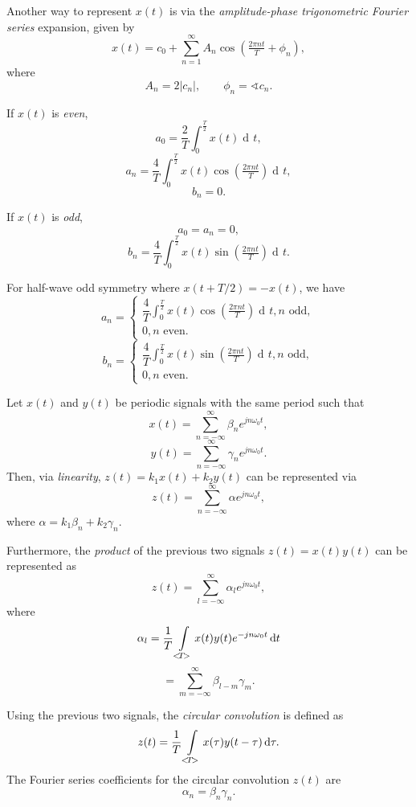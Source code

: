 \documentclass[10pt,letterpaper]{article}
\DeclareMathOperator{\di}{d\!} %
\newcommand{\sumi}[1][1]{ \sum_{n={#1}}^{\infty} } %
\newcommand{\bracks}[1]{ \left( #1 \right) } %
\newcommand{\tpfrac}[2]{\left(\tfrac{#1}{#2}\right)} %
\newcommand{\abs}[1]{\left| #1 \right|} %
\newcommand{\xabs}{ \abs{x(t)}^2 }
\newcommand{\Uint}{ \int\displaylimits_{<\!T\!>} }
\newcommand{\fatcos}{ \cos\tpfrac{2\pi nt}{T} }
\newcommand{\fatsin}{ \sin\tpfrac{2\pi nt}{T} }
\newcommand{\Hint}{ \int_0^{\frac{T}{2}} }
\newcommand{\omegaE}{ e^{jn\omega_0t} }
\newcommand{\omegaEneg}{ e^{-jn\omega_0t} }
\begin{document}
\begin{multicols*}{3}
Another way to represent $x(t)$ is via the \textit{amplitude-phase trigonometric Fourier series} expansion, given by
\[ x(t) = c_0 + \sumi A_n \cos\bracks{\tfrac{2\pi nt}{T} + \phi_n}, \]
where
\[ A_n = 2|c_n|, \qquad \phi_n = \sphericalangle c_n. \]

If $x(t)$ is \textit{even},
\[ a_0 = \dfrac{2}{T} \Hint x(t) \di t, \]
\[ a_n = \dfrac{4}{T} \Hint x(t) \fatcos \di t, \]
\[ b_n = 0. \]

If $x(t)$ is \textit{odd},
\[ a_0 = a_n = 0, \]
\[ b_n = \dfrac{4}{T} \Hint x(t) \fatsin \di t. \]

For half-wave odd symmetry where $x(t + T/2) = -x(t)$, we have
\[ a_n = \begin{cases}
		\dfrac{4}{T} \displaystyle\Hint x(t) \fatcos \di t, n \text{ odd}, \\
		0, n \text{ even}.
		\end{cases} 
\]
\[ b_n = \begin{cases}
		\dfrac{4}{T} \displaystyle\Hint x(t) \fatsin \di t, n \text{ odd}, \\
		0, n \text{ even}.
		\end{cases} 
\]

Let $x(t)$ and $y(t)$ be periodic signals with the same period such that
\[ x(t) = \sumi[-\infty] \beta_n \omegaE, \]
\[ y(t) = \sumi[-\infty] \gamma_n \omegaE. \]
Then, via \textit{linearity}, $z(t) = k_1x(t) + k_2y(t)$ can be represented via
\[ z(t) = \sumi[-\infty] \alpha \omegaE, \]
where $\alpha = k_1\beta_n + k_2\gamma_n$. 

Furthermore, the \textit{product} of the previous two signals $z(t) = x(t)y(t)$ can be represented as
\[ z(t) = \sum_{l = -\infty}^{\infty} \alpha_l \omegaE, \]
where
\[ \alpha_l = \dfrac{1}{T} \Uint x(t)y(t) \omegaEneg \di t \]
\[ = \sum^{\infty}_{m = -\infty}\beta_{l-m}\gamma_m. \]

Using the previous two signals, the \textit{circular convolution} is defined as
\[ z(t) = \dfrac{1}{T} \Uint x(\tau) y(t-\tau) \di \tau. \]
The Fourier series coefficients for the circular convolution $z(t)$ are
\[ \alpha_n = \beta_n\gamma_n. \]




\end{multicols*}
\end{document}
